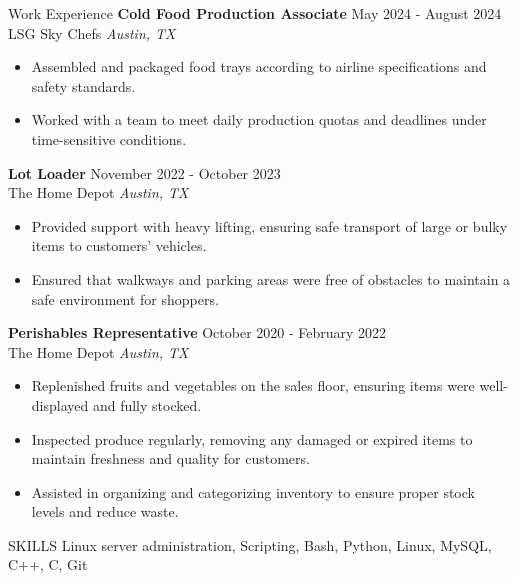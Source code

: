\documentclass{resume} %
\begin{document}
    \begin{rSection}{Work Experience}
        \textbf{Cold Food Production Associate} \hfill May 2024 - August 2024 \\
        LSG Sky Chefs \hfill \textit{Austin, TX}
        \begin{itemize}
            \itemsep -3pt {} 
            \item Assembled and packaged food trays according to airline specifications and safety standards.
            \item Worked with a team to meet daily production quotas and deadlines under time-sensitive conditions.
        \end{itemize}
        
        \textbf{Lot Loader} \hfill November 2022 - October 2023 \\
        The Home Depot \hfill \textit{Austin, TX}
        \begin{itemize}
            \itemsep -3pt {} 
            \item Provided support with heavy lifting, ensuring safe transport of large or bulky items to customers' vehicles.
            \item Ensured that walkways and parking areas were free of obstacles to maintain a safe environment for shoppers.
        \end{itemize}

        \textbf{Perishables Representative} \hfill October 2020 - February 2022 \\
        The Home Depot \hfill \textit{Austin, TX}
        \begin{itemize}
            \itemsep -3pt {} 
            \item Replenished fruits and vegetables on the sales floor, ensuring items were well-displayed and fully stocked.
            \item Inspected produce regularly, removing any damaged or expired items to maintain freshness and quality for customers.
            \item Assisted in organizing and categorizing inventory to ensure proper stock levels and reduce waste.
        \end{itemize}
    \end{rSection} 

    \begin{rSection}{SKILLS}
        Linux server administration, Scripting, Bash, Python, Linux, MySQL, C++, C, Git
    \end{rSection}
\end{document}
